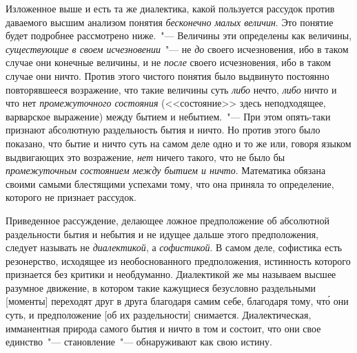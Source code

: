 Изложенное выше и есть та же диалектика, какой
пользуется рассудок против даваемого высшим анализом
понятия \emph{бесконечно малых величин}. Это понятие будет
подробнее рассмотрено ниже.~"--- Величины эти определены
как величины, \emph{существующие в своем исчезновении}~"---
не \emph{до} своего исчезновения, ибо в таком случае они конечные
величины, и не \emph{после} своего исчезновения, ибо в таком
случае они ничто. Против этого чистого понятия
было выдвинуто постоянно повторявшееся возражение,
что такие величины суть \emph{либо} нечто, \emph{либо} ничто и что
нет \emph{промежуточного состояния} (<<состояние>> здесь неподходящее,
варварское выражение) между бытием и небытием.~"---
При этом опять-таки признают абсолютную раздельность
бытия и ничто. Но против этого было показано,
что бытие и ничто суть на самом деле одно и то же или,
говоря языком выдвигающих это возражение, \emph{нет} ничего
такого, что не было бы \emph{промежуточным состоянием между
бытием и ничто}. Математика обязана своими самыми блестящими
успехами тому, что она приняла то определение,
которого не признает рассудок.

Приведенное рассуждение, делающее ложное предположение
об абсолютной раздельности бытия и небытия и
не идущее дальше этого предположения, следует называть
не \emph{диалектикой}, а \emph{софистикой}. В самом деле, софистика
есть резонерство, исходящее из необоснованного предположения,
истинность которого признается без критики и
необдуманно. Диалектикой же мы называем высшее разумное
движение, в котором такие кажущиеся безусловно
раздельными [моменты] переходят друг в друга благодаря
самим себе, благодаря тому, чт\'о они суть, и предположение
[об их раздельности] снимается. Диалектическая, имманентная
природа самого бытия и ничто в том и состоит,
что они свое единство~"--- становление~"--- обнаруживают
как свою истину.


